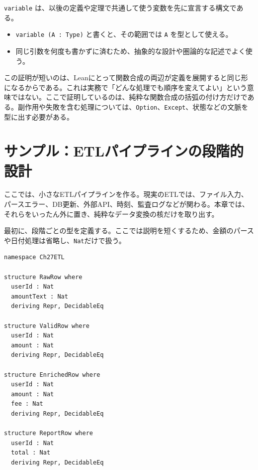 \begin{syntaxbox}
\texttt{variable} は、以後の定義や定理で共通して使う変数を先に宣言する構文である。
\begin{itemize}
\item \texttt{variable (A : Type)} と書くと、その範囲では \texttt{A} を型として使える。
\item 同じ引数を何度も書かずに済むため、抽象的な設計や圏論的な記述でよく使う。
\end{itemize}
\end{syntaxbox}


この証明が短いのは、Leanにとって関数合成の両辺が定義を展開すると同じ形になるからである。これは実務で「どんな処理でも順序を変えてよい」という意味ではない。ここで証明しているのは、純粋な関数合成の括弧の付け方だけである。副作用や失敗を含む処理については、\texttt{Option}、\texttt{Except}、状態などの文脈を型に出す必要がある。

\section{サンプル：ETLパイプラインの段階的設計}

ここでは、小さなETLパイプラインを作る。現実のETLでは、ファイル入力、パースエラー、DB更新、外部API、時刻、監査ログなどが関わる。本章では、それらをいったん外に置き、純粋なデータ変換の核だけを取り出す。


最初に、段階ごとの型を定義する。ここでは説明を短くするため、金額のパースや日付処理は省略し、\texttt{Nat}だけで扱う。

\begin{listing}[htbp]
\begin{verbatim}
namespace Ch27ETL

structure RawRow where
  userId : Nat
  amountText : Nat
  deriving Repr, DecidableEq

structure ValidRow where
  userId : Nat
  amount : Nat
  deriving Repr, DecidableEq

structure EnrichedRow where
  userId : Nat
  amount : Nat
  fee : Nat
  deriving Repr, DecidableEq

structure ReportRow where
  userId : Nat
  total : Nat
  deriving Repr, DecidableEq
\end{verbatim}
\caption{ETLの段階を型として分ける}
\label{lst:ch27-etl-types}
\end{listing}

